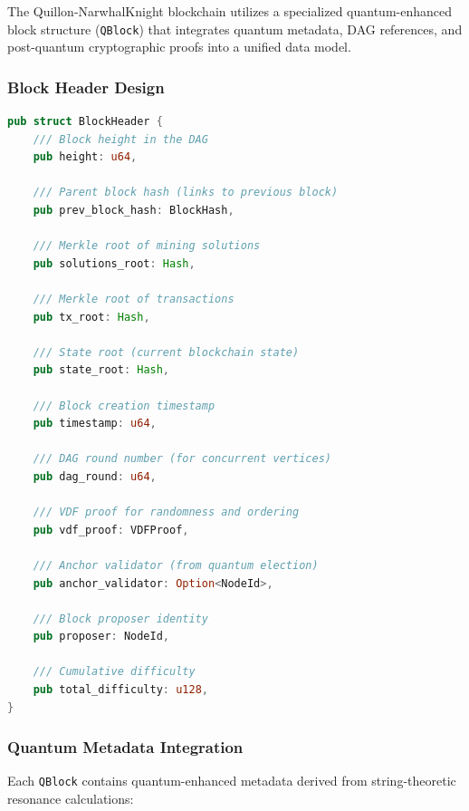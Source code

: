 \documentclass[11pt,a4paper]{article}
\begin{document}
The Quillon-NarwhalKnight blockchain utilizes a specialized quantum-enhanced block structure (\texttt{QBlock}) that integrates quantum metadata, DAG references, and post-quantum cryptographic proofs into a unified data model.

\subsubsection{Block Header Design}

\begin{lstlisting}[language=Rust, caption=QBlock Header Structure]
pub struct BlockHeader {
    /// Block height in the DAG
    pub height: u64,

    /// Parent block hash (links to previous block)
    pub prev_block_hash: BlockHash,

    /// Merkle root of mining solutions
    pub solutions_root: Hash,

    /// Merkle root of transactions
    pub tx_root: Hash,

    /// State root (current blockchain state)
    pub state_root: Hash,

    /// Block creation timestamp
    pub timestamp: u64,

    /// DAG round number (for concurrent vertices)
    pub dag_round: u64,

    /// VDF proof for randomness and ordering
    pub vdf_proof: VDFProof,

    /// Anchor validator (from quantum election)
    pub anchor_validator: Option<NodeId>,

    /// Block proposer identity
    pub proposer: NodeId,

    /// Cumulative difficulty
    pub total_difficulty: u128,
}
\end{lstlisting}

\subsubsection{Quantum Metadata Integration}

Each \texttt{QBlock} contains quantum-enhanced metadata derived from string-theoretic resonance calculations:
\end{document}
